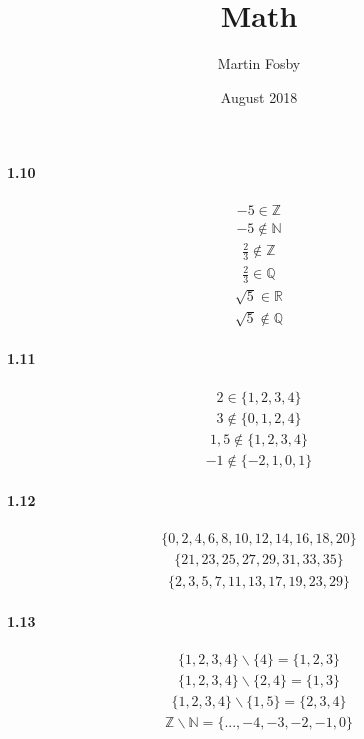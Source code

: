 \documentclass{article}
\title{Math}
\author{Martin Fosby }
\date{August 2018}
\newcommand{\Z}{\mathbb{Z}}
\newcommand{\N}{\mathbb{N}}
\newcommand{\Q}{\mathbb{Q}}
\newcommand{\R}{\mathbb{R}}
\begin{document}

\paragraph{1.10}
\begin{align*}
   -5 \in \Z 
\end{align*}
\begin{align*}
   -5 \notin \N 
\end{align*}
\begin{align*}
   \frac{2}{3} \notin \Z
\end{align*}
\begin{align*}
  \frac{2}{3} \in \Q
\end{align*}
\begin{align*}
  \sqrt{5} \in \R
\end{align*}
\begin{align*}
  \sqrt{5} \notin \Q
\end{align*}

\paragraph{1.11}
\begin{align*}
  2 \in \{1,2,3,4\}
\end{align*}
\begin{align*}
  3 \notin \{0,1,2,4\}
\end{align*}
\begin{align*}
  1,5 \notin \{1,2,3,4\}
\end{align*}
\begin{align*}
  -1 \notin \{-2,1,0,1\}
\end{align*}

\paragraph{1.12}
\begin{align*}
  \{0,2,4,6,8,10,12,14,16,18,20\}
\end{align*}
\begin{align*}
  \{21,23,25,27,29,31,33,35\}
\end{align*}
\begin{align*}
  \{2,3,5,7,11,13,17,19,23,29\}
\end{align*}

\paragraph{1.13}
\begin{align*}
  \{1,2,3,4\} \backslash \{4\} = \{1,2,3\}
\end{align*}
\begin{align*}
  \{1,2,3,4\} \backslash \{2,4\} = \{1,3\}
\end{align*}
\begin{align*}
  \{1,2,3,4\} \backslash \{1,5\} = \{2,3,4\}
\end{align*}
\begin{align*}
  \Z \backslash \N = \{..., -4, -3, -2, -1, 0\}
\end{align*}
\end{document}
